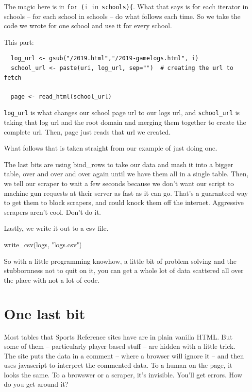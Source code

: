 \documentclass[
  letterpaper,
  DIV=11,
  numbers=noendperiod]{scrreprt}
\newenvironment{Shaded}{\begin{snugshade}}{\end{snugshade}}
\newcommand{\FunctionTok}[1]{\textcolor[rgb]{0.28,0.35,0.67}{#1}}
\newcommand{\NormalTok}[1]{\textcolor[rgb]{0.00,0.23,0.31}{#1}}
\newcommand{\StringTok}[1]{\textcolor[rgb]{0.13,0.47,0.30}{#1}}
\begin{document}
The magic here is in \texttt{for\ (i\ in\ schools)\{}. What that says is
for each iterator in schools -- for each school in schools -- do what
follows each time. So we take the code we wrote for one school and use
it for every school.

This part:

\begin{verbatim}
  log_url <- gsub("/2019.html","/2019-gamelogs.html", i)
  school_url <- paste(uri, log_url, sep="")  # creating the url to fetch
  
  page <- read_html(school_url)
\end{verbatim}

\texttt{log\_url} is what changes our school page url to our logs url,
and \texttt{school\_url} is taking that log url and the root domain and
merging them together to create the complete url. Then, page just reads
that url we created.

What follows that is taken straight from our example of just doing one.

The last bits are using bind\_rows to take our data and mash it into a
bigger table, over and over and over again until we have them all in a
single table. Then, we tell our scraper to wait a few seconds because we
don't want our script to machine gun requests at their server as fast as
it can go. That's a guaranteed way to get them to block scrapers, and
could knock them off the internet. Aggressive scrapers aren't cool.
Don't do it.

Lastly, we write it out to a csv file.

\begin{Shaded}
\begin{Highlighting}[]
\FunctionTok{write\_csv}\NormalTok{(logs, }\StringTok{"logs.csv"}\NormalTok{)}
\end{Highlighting}
\end{Shaded}

So with a little programming knowhow, a little bit of problem solving
and the stubbornness not to quit on it, you can get a whole lot of data
scattered all over the place with not a lot of code.

\hypertarget{one-last-bit}{%
\section{One last bit}\label{one-last-bit}}

Most tables that Sports Reference sites have are in plain vanilla HTML.
But some of them -- particularly player based stuff -- are hidden with a
little trick. The site puts the data in a comment -- where a browser
will ignore it -- and then uses javascript to interpret the commented
data. To a human on the page, it looks the same. To a browswer or a
scraper, it's invisible. You'll get errors. How do you get around it?
\end{document}
